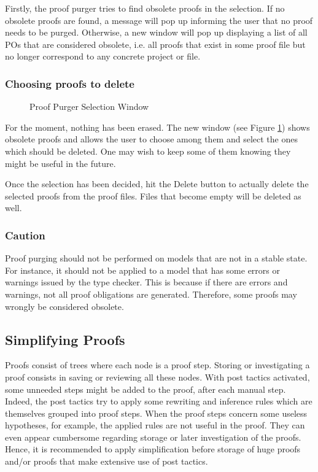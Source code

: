 Firstly, the proof purger tries to find obsolete proofs in the selection. If no obsolete proofs are found, a message will pop up informing the user that no proof needs to be purged. Otherwise, a new window will pop up displaying a list of all POs that are considered obsolete, i.e. all proofs that exist in some proof file but no longer correspond to any concrete project or file.

\subsubsection{Choosing proofs to delete}

\begin{figure}[h!t]
\begin{center}
	\caption{Proof Purger Selection Window}
	\label{fig_ref_10_proof_purger}
\end{center}
\end{figure}

For the moment, nothing has been erased. The new window (see Figure \ref{fig_ref_10_proof_purger}) shows obsolete proofs and allows the user to choose among them and select the ones which should be deleted. One may wish to keep some of them knowing they might be useful in the future.

Once the selection has been decided, hit the \textsf{Delete} button to actually delete the selected proofs from the proof files. Files that become empty will be deleted as well.

\subsubsection{Caution}

Proof purging should not be performed on models that are not in a stable state. For instance, it should not be applied to a model that has some errors or warnings issued by the type checker. This is because if there are errors and warnings, not all proof obligations are generated. Therefore, some proofs may wrongly be considered obsolete.

\subsection{Simplifying Proofs}
\label{simplifying_proofs}

Proofs consist of trees where each node is a proof step. Storing or investigating a proof consists in saving or reviewing all these nodes. With post tactics activated, some unneeded steps might be added to the proof, after each manual step. Indeed, the post tactics try to apply some rewriting and inference rules which are themselves grouped into proof steps. When the proof steps concern some useless hypotheses, for example, the applied rules are not useful in the proof. They can even appear cumbersome regarding storage or later investigation of the proofs. Hence, it is recommended to apply simplification before storage of huge proofs and/or proofs that make extensive use of post tactics.

